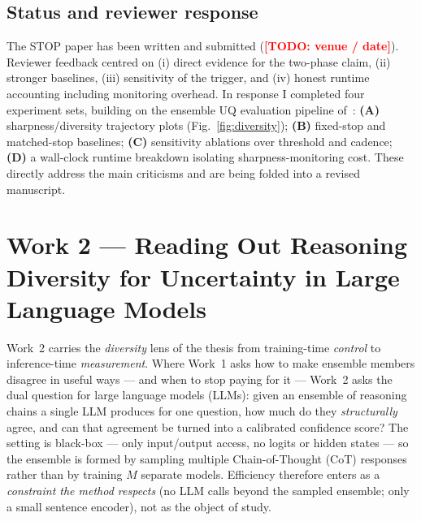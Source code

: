\documentclass[11pt]{article}
\newcommand{\TODO}[1]{\textcolor{red}{\textbf{[TODO: #1]}}}
\begin{document}
\subsection{Status and reviewer response}
The STOP paper has been written and submitted (\TODO{venue / date}). Reviewer feedback centred on
(i) direct evidence for the two-phase claim, (ii) stronger baselines, (iii) sensitivity of the
trigger, and (iv) honest runtime accounting including monitoring overhead. In response I completed
four experiment sets, building on the ensemble UQ evaluation pipeline of~\cite{seligmann2024beyond}:
\textbf{(A)} sharpness/diversity trajectory plots (Fig.~\ref{fig:diversity});
\textbf{(B)} fixed-stop and matched-stop baselines; \textbf{(C)} sensitivity ablations over
threshold and cadence; \textbf{(D)} a wall-clock runtime breakdown isolating sharpness-monitoring
cost. These directly address the main criticisms and are being folded into a revised manuscript.

\section{Work 2 --- Reading Out Reasoning Diversity for Uncertainty in Large Language Models}
\label{sec:work2}

Work~2 carries the \emph{diversity} lens of the thesis from training-time \emph{control} to
inference-time \emph{measurement}. Where Work~1 asks how to make ensemble members disagree in useful
ways --- and when to stop paying for it --- Work~2 asks the dual question for large language models
(LLMs): given an ensemble of reasoning chains a single LLM produces for one question, how much do
they \emph{structurally} agree, and can that agreement be turned into a calibrated confidence score?
The setting is black-box --- only input/output access, no logits or hidden states --- so the
ensemble is formed by sampling multiple Chain-of-Thought (CoT) responses rather than by training
$M$ separate models. Efficiency therefore enters as a \emph{constraint the method respects} (no LLM
calls beyond the sampled ensemble; only a small sentence encoder), not as the object of study.
\end{document}
